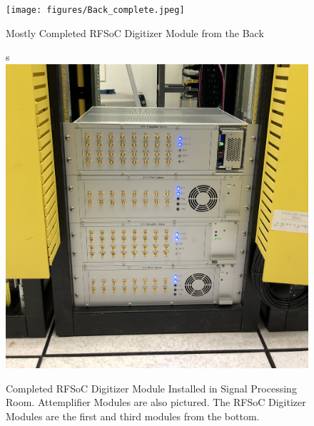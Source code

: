 \documentclass[12pt,a4paper,oneside]{article}
\begin{document}
\begin{figure}[H]
\centering
\texttt{[image: figures/Back\_complete.jpeg]}
\caption{Mostly Completed RFSoC Digitizer Module from the Back}
\label{fig:Back_complete}
\end{figure}

\begin{figure}[H]
\centering
s\includegraphics[width=.9\linewidth]{figures/Installed_in_Rack.jpeg}
\caption{Completed RFSoC Digitizer Module Installed in Signal Processing Room. Attemplifier Modules are also pictured. The RFSoC Digitizer Modules are the first and third modules from the bottom.}
\label{fig:Enclosure_in_Rack}
\end{figure}

\newpage



\appendix






\end{document}
